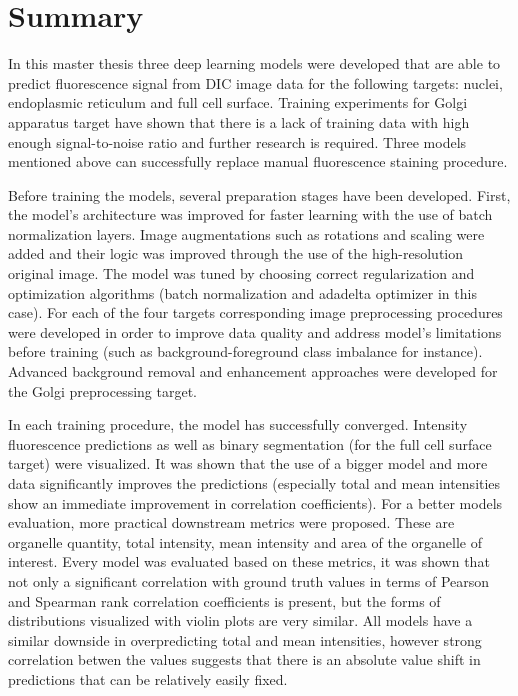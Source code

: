 \section{Summary}
In this master thesis three deep learning models were developed that are able to predict fluorescence signal from DIC image data for the following targets: nuclei, endoplasmic reticulum and full cell surface. Training experiments for Golgi apparatus target have shown that there is a lack of training data with high enough signal-to-noise ratio and further research is required. Three models mentioned above can successfully replace manual fluorescence staining procedure.

Before training the models, several preparation stages have been developed. First, the model's architecture was improved for faster learning with the use of batch normalization layers. Image augmentations such as rotations and scaling were added and their logic was improved through the use of the high-resolution original image. The model was tuned by choosing correct regularization and optimization algorithms (batch normalization and adadelta optimizer in this case). For each of the four targets corresponding image preprocessing  procedures were developed in order to improve data quality and address model's limitations before training (such as background-foreground class imbalance for instance). Advanced background removal and enhancement approaches were developed for the Golgi preprocessing target.

In each training procedure, the model has successfully converged. Intensity fluorescence predictions as well as binary segmentation (for the full cell surface target) were visualized. It was shown that the use of a bigger model and more data significantly improves the predictions (especially total and mean intensities show an immediate improvement in correlation coefficients). For a better models evaluation, more practical downstream metrics were proposed. These are organelle quantity, total intensity, mean intensity and area of the organelle of interest. Every model was evaluated based on these metrics, it was shown that not only a significant correlation with ground truth values in terms of Pearson and Spearman rank correlation coefficients is present, but the forms of distributions visualized with violin plots are very similar. All models have a similar downside in overpredicting total and mean intensities, however strong correlation betwen the values suggests that there is an absolute value shift in predictions that can be relatively easily fixed.


